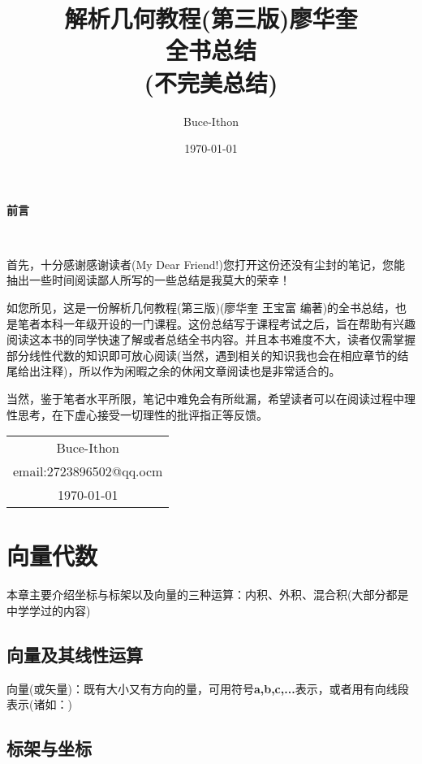 \documentclass[12pt,a4paper,oneside]{ctexbook}
\title{{\Huge{\textbf{解析几何教程(第三版)廖华奎\\ 全书总结}}}\\(不完美总结)}
\author{Buce-Ithon}
\date{\today}
\begin{document}
\maketitle

\setcounter{page}{1}
\begin{center}
	\Huge\textbf{前言}
\end{center}~\


首先，十分感谢感谢读者(My Dear Friend!)您打开这份还没有尘封的笔记，您能抽出一些时间阅读鄙人所写的一些总结是我莫大的荣幸！


如您所见，这是一份解析几何教程(第三版)(廖华奎 王宝富 编著)的全书总结，也是笔者本科一年级开设的一门课程。这份总结写于课程考试之后，旨在帮助有兴趣阅读这本书的同学快速了解或者总结全书内容。并且本书难度不大，读者仅需掌握部分线性代数的知识即可放心阅读(当然，遇到相关的知识我也会在相应章节的结尾给出注释)，所以作为闲暇之余的休闲文章阅读也是非常适合的。


当然，鉴于笔者水平所限，笔记中难免会有所纰漏，希望读者可以在阅读过程中理性思考，在下虚心接受一切理性的批评指正等反馈。
~\\
\begin{flushright}
	\begin{tabular}{c}
		Buce-Ithon\\
		email:2723896502@qq.ocm\\
		\today
	\end{tabular}
\end{flushright}

\newpage
{}
\setcounter{page}{1}
\tableofcontents
\newpage
\setcounter{page}{1}

\chapter{向量代数}

本章主要介绍坐标与标架以及向量的三种运算：内积、外积、混合积(大部分都是中学学过的内容)

\section{向量及其线性运算}

向量(或矢量)：既有大小又有方向的量，可用符号\textbf{a,b,c,...}表示，或者用有向线段表示(诸如：)

\section{标架与坐标}
\end{document}
